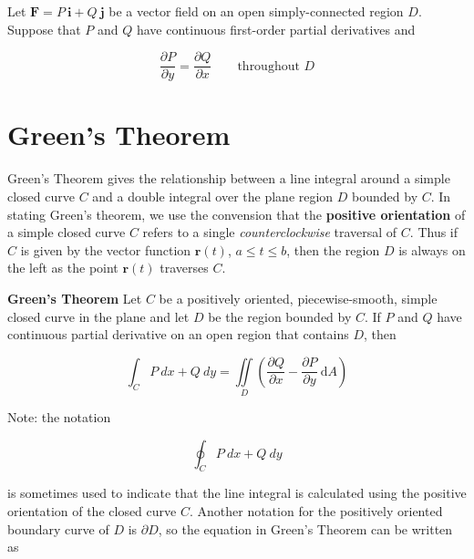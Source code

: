 \documentclass{article}
\begin{document}
\begin{center}
    Let $\mathbf{F} = P \ \mathbf{i} + Q \ \mathbf{j}$ be a vector field on an open simply-connected region $D$. Suppose that $P$ and $Q$ have continuous first-order partial derivatives and 

    \begin{equation*}
        \frac{\partial P}{ \partial y} = \frac{\partial Q}{ \partial x} \qquad \text{throughout } D 
    \end{equation*}
\end{center}


\newpage
\section{Green's Theorem}

Green's Theorem gives the relationship between a line integral around a simple closed curve $C$ and a double integral over the plane region $D$ bounded by $C$. In stating Green's theorem, we use the convension that the \textbf{positive orientation} of a simple closed curve $C$ refers to a single \textit{counterclockwise} traversal of $C$. Thus if $C$ is given by the vector function $\mathbf{r}(t)$, $a \leq t \leq b$, then the region $D$ is always on the left as the point $\mathbf{r}(t)$ traverses $C$.
\\

\begin{center}
    \textbf{Green's Theorem} Let $C$ be a positively oriented, piecewise-smooth, simple closed curve in the plane and let $D$ be the region bounded by $C$. If $P$ and $Q$ have continuous partial derivative on an open region that contains $D$, then 

    \begin{equation*}
        \int_C P \ dx + Q \ dy = \iint\limits_{D} (\frac{\partial Q}{\partial x} - \frac{\partial P}{\partial y} \ \mathrm{d}A)
    \end{equation*}
\end{center}

Note: the notation 

\begin{equation*}
    \oint_C P \ dx + Q \ dy 
\end{equation*}

is sometimes used to indicate that the line integral is calculated using the positive orientation of the closed curve $C$. Another notation for the positively oriented boundary curve of $D$ is $\partial D$, so the equation in Green's Theorem can be written as 
\end{document}
